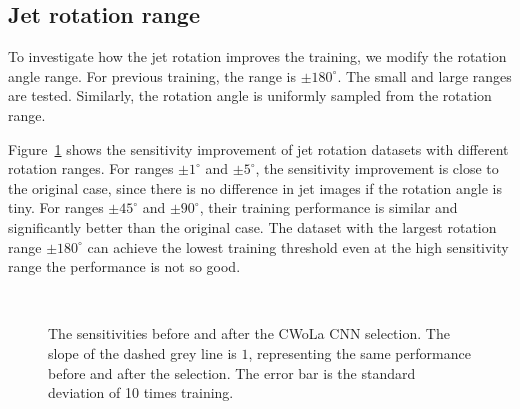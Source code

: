 \documentclass[12pt]{article}
\begin{document}
    \subsection{Jet rotation range}%
    \label{sub:jet_rotation_range}
        To investigate how the jet rotation improves the training, we modify the rotation angle range. For previous training, the range is $\pm 180^\circ$. The small and large ranges are tested. Similarly, the rotation angle is uniformly sampled from the rotation range.

        Figure~\ref{fig:sensitivity_improvement_origin_jet_aug_5_range_1_5_45_90_180} shows the sensitivity improvement of jet rotation datasets with different rotation ranges. For ranges $\pm 1^\circ$ and $\pm 5^\circ$, the sensitivity improvement is close to the original case, since there is no difference in jet images if the rotation angle is tiny. For ranges $\pm 45^\circ$ and  $\pm 90^\circ$, their training performance is similar and significantly better than the original case. The dataset with the largest rotation range $\pm 180^\circ$ can achieve the lowest training threshold even at the high sensitivity range the performance is not so good.
        \begin{figure}[htpb]
            \centering
             \\
            \caption{The sensitivities before and after the CWoLa CNN selection. The slope of the dashed grey line is $1$, representing the same performance before and after the selection. The error bar is the standard deviation of 10 times training.}
            \label{fig:sensitivity_improvement_origin_jet_aug_5_range_1_5_45_90_180}
        \end{figure}
\end{document}
